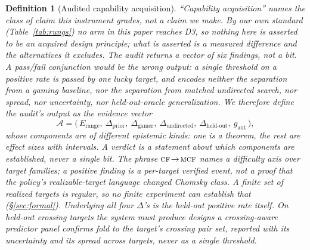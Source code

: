 \documentclass[11pt]{article}
\newtheorem{definition}{Definition}
\newcommand{\CF}{\textsc{cf}}
\newcommand{\MCF}{\textsc{mcf}}
\begin{document}
\begin{definition}[Audited capability acquisition]\label{def:cert}
\emph{``Capability acquisition'' names the class of claim this instrument grades, not a claim we make.} By our
own standard (Table~\ref{tab:rungs}) no arm in this paper reaches D3, so nothing here is asserted to be an
acquired design principle; what is asserted is a measured difference and the alternatives it excludes.
\emph{The audit returns a vector of six findings, not a bit.} A pass/fail conjunction would be the wrong
output: a single threshold on a positive rate is passed by one lucky target, and encodes neither the
separation from a gaming baseline, nor the separation from matched undirected search, nor spread, nor
uncertainty, nor held-out-oracle generalization. We therefore define the audit's output as the evidence vector
\begin{equation}\label{eq:vector}
  \mathcal A=\bigl(\,E_{\mathrm{range}},\ \Delta_{\mathrm{prior}},\ \Delta_{\mathrm{gamer}},\
  \Delta_{\mathrm{undirected}},\ \Delta_{\mathrm{held\text{-}out}},\ g_{\mathrm{aut}}\,\bigr),
\end{equation}
whose components are of \emph{different epistemic kinds}: one is a theorem, the rest are effect sizes with
intervals. A verdict is a statement about which components are established, never a single bit. The phrase
$\CF\!\to\!\MCF$ names a difficulty axis over target \emph{families}; a positive finding is a per-target
verified event, not a proof that the policy's realizable-target \emph{language} changed Chomsky class. A
finite set of realized targets is regular, so no finite experiment can establish that (\S\ref{sec:formal}). Underlying all four
$\Delta$'s is the held-out positive rate itself. On held-out crossing targets the system must produce designs
a crossing-aware predictor panel confirms fold to the target's crossing pair set, reported with its
uncertainty and its spread across targets, never as a single threshold.



\end{definition}
\end{document}
